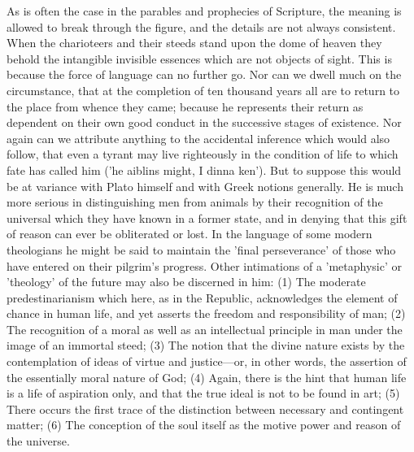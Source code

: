 \documentclass[11pt,letter]{article}
\begin{document}
\par  As is often the case in the parables and prophecies of Scripture, the meaning is allowed to break through the figure, and the details are not always consistent. When the charioteers and their steeds stand upon the dome of heaven they behold the intangible invisible essences which are not objects of sight. This is because the force of language can no further go. Nor can we dwell much on the circumstance, that at the completion of ten thousand years all are to return to the place from whence they came; because he represents their return as dependent on their own good conduct in the successive stages of existence. Nor again can we attribute anything to the accidental inference which would also follow, that even a tyrant may live righteously in the condition of life to which fate has called him ('he aiblins might, I dinna ken'). But to suppose this would be at variance with Plato himself and with Greek notions generally. He is much more serious in distinguishing men from animals by their recognition of the universal which they have known in a former state, and in denying that this gift of reason can ever be obliterated or lost. In the language of some modern theologians he might be said to maintain the 'final perseverance' of those who have entered on their pilgrim's progress. Other intimations of a 'metaphysic' or 'theology' of the future may also be discerned in him: (1) The moderate predestinarianism which here, as in the Republic, acknowledges the element of chance in human life, and yet asserts the freedom and responsibility of man; (2) The recognition of a moral as well as an intellectual principle in man under the image of an immortal steed; (3) The notion that the divine nature exists by the contemplation of ideas of virtue and justice—or, in other words, the assertion of the essentially moral nature of God; (4) Again, there is the hint that human life is a life of aspiration only, and that the true ideal is not to be found in art; (5) There occurs the first trace of the distinction between necessary and contingent matter; (6) The conception of the soul itself as the motive power and reason of the universe.
\end{document}
